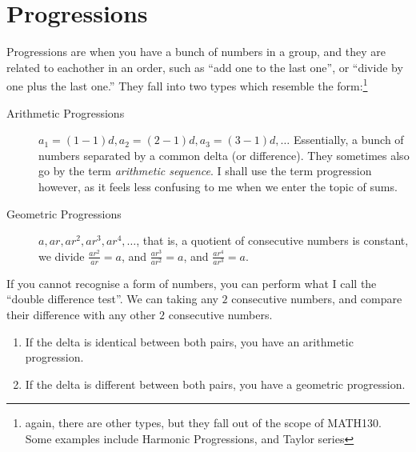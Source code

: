 \chapter{Progressions}
\label{chap:Progressions}
Progressions are when you have a bunch of numbers in a group, and they are
related to eachother in an order, such as ``add one to the last one'', or
``divide by one plus the last one.'' They fall into two types which resemble the
form:\footnote{again, there are other types, but they fall out of the scope of
MATH130. Some examples include Harmonic Progressions, and Taylor series}

\begin{description}
  \item[Arithmetic Progressions] $a_1 = (1-1)d, a_2 = (2-1)d, a_3 = (3-1)d,
  \ldots$ Essentially, a bunch of numbers separated by a common delta (or
  difference). They sometimes also go by the term \emph{arithmetic sequence}. I
  shall use the term progression however, as it feels less confusing to me when
  we enter the topic of sums.
  \item[Geometric Progressions] $a, ar, ar^2, ar^3, ar^4, \ldots$, that is, a
  quotient of consecutive numbers is constant, we divide $\frac{ar^2}{ar} = a$,
  and $\frac{ar^3}{ar^2} = a$, and $\frac{ar^4}{ar^3} = a$.
\end{description}
If you cannot recognise a form of numbers, you can perform what I call the
``double difference test''. We can taking any $2$ consecutive numbers, and
compare their difference with any other $2$ consecutive numbers.
\begin{enumerate}
  \item If the delta is identical between both pairs, you have an arithmetic
  progression.
  \item If the delta is different between both pairs, you have a geometric
  progression.
\end{enumerate}

